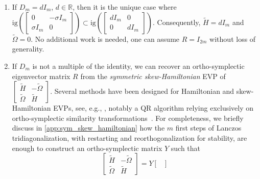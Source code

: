 \documentclass[10pt,twoside,dvipsnames]{siamart1116}
\numberwithin{algorithm}{section}
\numberwithin{equation}{section}
\newcommand{\wordref}[2]{\hyperlink{#1}{#2}}
\begin{document}
	\begin{enumerate}
		\item If $D_m=dI_m$, $d\in\mathbb{R}$, then it is the unique case where $\mathrm{ig}\left(\left[\begin{smallmatrix}
	0&-\sigma I_m\\
	\sigma I_m&0
	\end{smallmatrix}\right]\right)\subset\mathrm{ig}\left( \left[\begin{smallmatrix}d I_m&0\\
		0&d I_m
	\end{smallmatrix}\right]\right)$. Consequently, $\widetilde{H} = d I_m$ and $\widetilde{\Omega} = 0$. No additional work is needed, one can assume $R=I_{2m}$ without loss of generality.
		\item If $D_m$ is not a multiple of the identity, we can recover an ortho-symplectic eigenvector matrix $R$ from the \emph{symmetric skew-Hamiltonian} EVP of $\left[\begin{smallmatrix}\widetilde{H}&-\widetilde{\Omega}\\
	\widetilde{\Omega}&\widetilde{H}\end{smallmatrix}\right]$. Several methods have been designed for Hamiltonian and skew-Hamiltonian EVPs, see, e.g.,  \cite{BENNER199775,WATKINS200423,BennerHamiltonian,VANLOAN1984233,FABENDER1999125}, notably a QR algorithm relying exclusively on ortho-symplectic similarity transformations~\cite{VANLOAN1984233}. For completeness, we briefly discuss in \cref{app:sym_skew_hamiltonian} how the $m$ first steps of Lanczos tridiagonalization, with restarting and reorthogonalization for stability, are enough to construct an ortho-symplectic matrix $Y$ such that%
		\begin{equation}\label{eq:skew_hamiltonian}
			\begin{bmatrix}
				\widetilde{H}&-\widetilde{\Omega}\\
	\widetilde{\Omega}&\widetilde{H}
			\end{bmatrix}=Y\begin{bmatrix}

\end{bmatrix}
\end{equation}
\end{enumerate}
\end{document}

